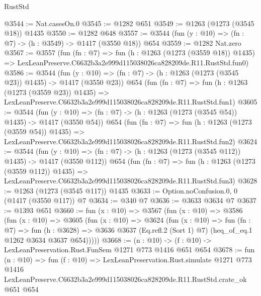\begin{lexlean}{RustStd}
\begin{coremodule}
@3544 := Nat.casesOn.{0}
@3545 := @1282 @651
@3549 := @1263 (@1273 (@3545 @18)) @1435
@3550 := @1282 @648
@3557 := @3544 (fun (y : @10) => (fn : @7) -> (h : @3549) -> @1417 (@3550 @18)) @654
@3559 := @1282 Nat.zero
@3567 := @3557
    (fun (fn : @7) =>
    fun (h : @1263 (@1273 (@3559 @18)) @1435) =>
    LexLeanPreserve.C6632b3a2e999d115038026ca828209de.R11.RustStd.fun0)
@3586 := @3544
    (fun (y : @10) => (fn : @7) -> (h : @1263 (@1273 (@3545 @23)) @1435) -> @1417 (@3550 @23))
    @654
    (fun (fn : @7) =>
    fun (h : @1263 (@1273 (@3559 @23)) @1435) =>
    LexLeanPreserve.C6632b3a2e999d115038026ca828209de.R11.RustStd.fun1)
@3605 := @3544
    (fun (y : @10) => (fn : @7) -> (h : @1263 (@1273 (@3545 @54)) @1435) -> @1417 (@3550 @54))
    @654
    (fun (fn : @7) =>
    fun (h : @1263 (@1273 (@3559 @54)) @1435) =>
    LexLeanPreserve.C6632b3a2e999d115038026ca828209de.R11.RustStd.fun2)
@3624 := @3544
    (fun (y : @10) => (fn : @7) -> (h : @1263 (@1273 (@3545 @112)) @1435) -> @1417 (@3550 @112))
    @654
    (fun (fn : @7) =>
    fun (h : @1263 (@1273 (@3559 @112)) @1435) =>
    LexLeanPreserve.C6632b3a2e999d115038026ca828209de.R11.RustStd.fun3)
@3628 := @1263 (@1273 (@3545 @117)) @1435
@3633 := Option.noConfusion.{0, 0} (@1417 (@3550 @117)) @7
@3634 := @340 @7
@3636 := @3633 @3634 @7
@3637 := @1393 @651
@3660 := fun (x : @10) =>
  @3567
    (fun (x : @10) =>
    @3586
      (fun (x : @10) =>
      @3605
        (fun (x : @10) =>
        @3624
          (fun (x : @10) =>
          fun (fn : @7) =>
          fun (h : @3628) =>
          @3636 @3637 (Eq.refl.{2} (Sort 1) @7) (heq_of_eq.{1} @1262 @3634 @3637 @654)))))
@3668 := (n : @10) -> (f : @10) -> LexLeanPreservation.Rust.FunSem @1271 @773 @1416 @651 @654
@3678 := fun (n : @10) =>
  fun (f : @10) =>
  LexLeanPreservation.Rust.simulate
    @1271
    @773
    @1416
    LexLeanPreserve.C6632b3a2e999d115038026ca828209de.R11.RustStd.crate_ok
    @651
    @654
\end{coremodule}
\end{lexlean}
